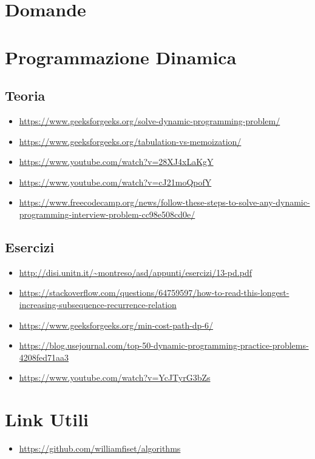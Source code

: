 \documentclass{article}
\begin{document}
\section{Domande}
\section{Programmazione Dinamica}
\subsection{Teoria}
\begin{itemize}
        \item\url{https://www.geeksforgeeks.org/solve-dynamic-programming-problem/}
        \item\url{https://www.geeksforgeeks.org/tabulation-vs-memoization/}
        \item\url{https://www.youtube.com/watch?v=28XJ4xLaKgY}    
        \item\url{https://www.youtube.com/watch?v=cJ21moQpofY}
        \item\url{https://www.freecodecamp.org/news/follow-these-steps-to-solve-any-dynamic-programming-interview-problem-cc98e508cd0e/}
\end{itemize}
\subsection{Esercizi}
\begin{itemize}
        \item\url{http://disi.unitn.it/~montreso/asd/appunti/esercizi/13-pd.pdf}
        \item\url{https://stackoverflow.com/questions/64759597/how-to-read-this-longest-increasing-subsequence-recurrence-relation}
        \item\url{https://www.geeksforgeeks.org/min-cost-path-dp-6/}
        \item\url{https://blog.usejournal.com/top-50-dynamic-programming-practice-problems-4208fed71aa3}
        \item\url{https://www.youtube.com/watch?v=YcJTyrG3bZs}    
\end{itemize}
\section{Link Utili}
\begin{itemize}
    \item \url{https://github.com/williamfiset/algorithms}
\end{itemize}
\end{document}
